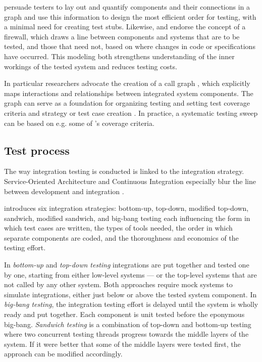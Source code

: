 \documentclass[12pt,a4paper,oneside,pdftex]{report}
\begin{document}

\citet{hewett2009automated} persuade testers to lay out and quantify components and their connections in a graph and use this information to design the most efficient order for testing, with a minimal need for creating test stubs. Likewise, \citet{leung1990study} and \citet{abdullah1995correcting} endorse the concept of a firewall, which draws a line between components and systems that are to be tested, and those that need not, based on where changes in code or specifications have occurred. This modeling both strengthens understanding of the inner workings of the tested system and reduces testing costs.

In particular researchers advocate the creation of a call graph \citep{leung1990study, hurlburt2012not, linnenkugel1990test}, which explicitly maps interactions and relationships between integrated system components. The graph can serve as a foundation for organizing testing and setting test coverage criteria and strategy or test case creation \citep{benz2007combining, hura2011method, linnenkugel1990test}. In practice, a systematic testing sweep can be based on e.g. some of \citeauthor{linnenkugel1990test}'s \citeyearpar{linnenkugel1990test} coverage criteria. 

\subsection{Test process}
The way integration testing is conducted is linked to the integration strategy. Service-Oriented Architecture and Continuous Integration especially blur the line between development and integration \citep{huang2008surrogate, wieczorek2010model}. 

\citet{myers1976software} introduces six integration strategies: bottom-up, top-down, modified top-down, sandwich, modified sandwich, and big-bang testing each influencing the form in which test cases are written, the types of tools needed, the order in which separate components are coded, and the thoroughness and economics of the testing effort. 

In \emph{bottom-up} and \emph{top-down testing} integrations are put together and tested one by one, starting from either low-level systems --- or the top-level systems that are not called by any other system. Both approaches require mock systems to simulate integrations, either just below or above the tested system component. In \emph{big-bang testing}, the integration testing effort is delayed until the system is wholly ready and put together. Each component is unit tested before the eponymous big-bang. \emph{Sandwich testing} is a combination of top-down and bottom-up testing where two concurrent testing threads progress towards the middle layers of the system. If it were better that some of the middle layers were tested first, the approach can be modified accordingly. \citep{burnstein2003practical, myers1976software}
\end{document}
